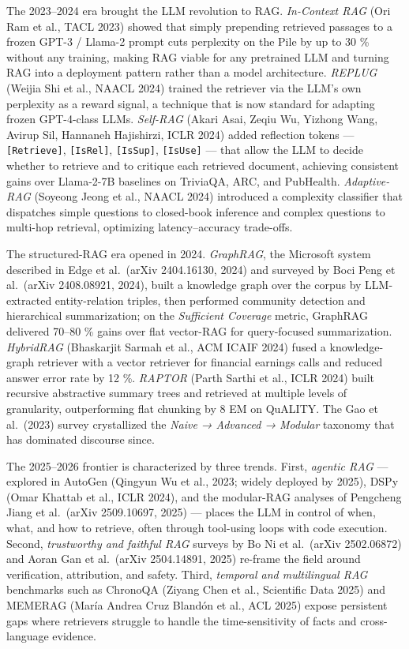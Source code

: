 \documentclass{article}
\begin{document}
The 2023--2024 era brought the LLM revolution to RAG. \emph{In-Context RAG} (Ori Ram et al., TACL 2023) showed that simply prepending retrieved passages to a frozen GPT-3 / Llama-2 prompt cuts perplexity on the Pile by up to 30 \% without any training, making RAG viable for any pretrained LLM and turning RAG into a deployment pattern rather than a model architecture. \emph{REPLUG} (Weijia Shi et al., NAACL 2024) trained the retriever via the LLM's own perplexity as a reward signal, a technique that is now standard for adapting frozen GPT-4-class LLMs. \emph{Self-RAG} (Akari Asai, Zeqiu Wu, Yizhong Wang, Avirup Sil, Hannaneh Hajishirzi, ICLR 2024) added reflection tokens --- \texttt{{[}Retrieve{]}}, \texttt{{[}IsRel{]}}, \texttt{{[}IsSup{]}}, \texttt{{[}IsUse{]}} --- that allow the LLM to decide whether to retrieve and to critique each retrieved document, achieving consistent gains over Llama-2-7B baselines on TriviaQA, ARC, and PubHealth. \emph{Adaptive-RAG} (Soyeong Jeong et al., NAACL 2024) introduced a complexity classifier that dispatches simple questions to closed-book inference and complex questions to multi-hop retrieval, optimizing latency--accuracy trade-offs.

The structured-RAG era opened in 2024. \emph{GraphRAG}, the Microsoft system described in Edge et al.~(arXiv 2404.16130, 2024) and surveyed by Boci Peng et al.~(arXiv 2408.08921, 2024), built a knowledge graph over the corpus by LLM-extracted entity-relation triples, then performed community detection and hierarchical summarization; on the \emph{Sufficient Coverage} metric, GraphRAG delivered 70--80 \% gains over flat vector-RAG for query-focused summarization. \emph{HybridRAG} (Bhaskarjit Sarmah et al., ACM ICAIF 2024) fused a knowledge-graph retriever with a vector retriever for financial earnings calls and reduced answer error rate by 12 \%. \emph{RAPTOR} (Parth Sarthi et al., ICLR 2024) built recursive abstractive summary trees and retrieved at multiple levels of granularity, outperforming flat chunking by 8 EM on QuALITY. The Gao et al.~(2023) survey crystallized the \emph{Naive → Advanced → Modular} taxonomy that has dominated discourse since.

The 2025--2026 frontier is characterized by three trends. First, \emph{agentic RAG} --- explored in AutoGen (Qingyun Wu et al., 2023; widely deployed by 2025), DSPy (Omar Khattab et al., ICLR 2024), and the modular-RAG analyses of Pengcheng Jiang et al.~(arXiv 2509.10697, 2025) --- places the LLM in control of when, what, and how to retrieve, often through tool-using loops with code execution. Second, \emph{trustworthy and faithful RAG} surveys by Bo Ni et al.~(arXiv 2502.06872) and Aoran Gan et al.~(arXiv 2504.14891, 2025) re-frame the field around verification, attribution, and safety. Third, \emph{temporal and multilingual RAG} benchmarks such as ChronoQA (Ziyang Chen et al., Scientific Data 2025) and MEMERAG (María Andrea Cruz Blandón et al., ACL 2025) expose persistent gaps where retrievers struggle to handle the time-sensitivity of facts and cross-language evidence.
\end{document}
